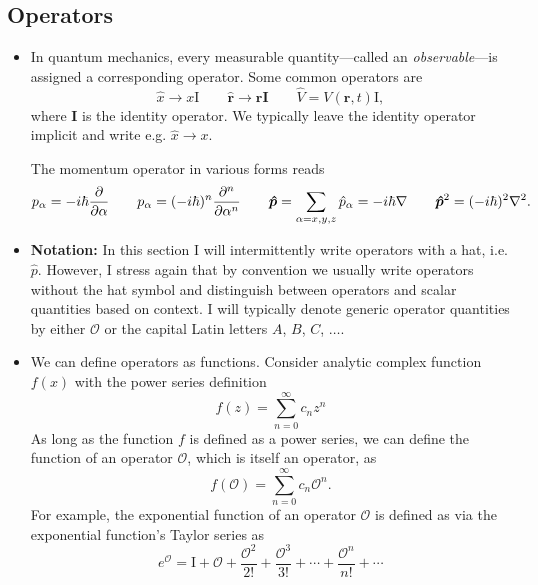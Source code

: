 \documentclass[11pt, a4paper]{article}
\renewcommand{\grad}{\nabla}
\renewcommand{\laplacian}{\nabla^{2}}
\renewcommand{\vec}[1]{\bm{#1}}  %
\newcommand{\mat}[1]{\mathbf{#1}}  %
\renewcommand{\r}{\vec{r}}  %
\renewcommand{\O}{\mathcal{O}}  %
\begin{document}
\subsection{Operators}
\begin{itemize}
	\item In quantum mechanics, every measurable quantity---called an \textit{observable}---is assigned a corresponding operator. Some common operators are
	\begin{equation*}
		\hat{x} \to x \mathrm{I} \qquad \hat{\r} \to \r \mat{I} \qquad \hat{V} = V(\r, t)\mathrm{I},
	\end{equation*}
	where $ \mat{I} $ is the identity operator. We typically leave the identity operator implicit and write e.g. $ \hat{x} \to x $. 
	
	The momentum operator in various forms reads
	\begin{equation*}
		p_{\alpha} = -i\hbar \pdv{}{\alpha} \qquad p_{\alpha} = (-i\hbar)^{n} \pdv[n]{}{\alpha} \qquad \vec{\hat{p}} = \sum_{\alpha = x, y, z} \hat{p}_{\alpha} = - i \hbar \grad \qquad \vec{\hat{p}}^{2} = (-i\hbar)^{2} \laplacian.
	\end{equation*}
	
	\item \textbf{Notation:} In this section I will intermittently write operators with a hat, i.e. $ \hat{p} $. However, I stress again that by convention we usually write operators without the hat symbol and distinguish between operators and scalar quantities based on context. I will typically denote generic operator quantities by either $ \O $ or the capital Latin letters $ A $, $ B $, $ C $, $ \ldots  $.
	
	\item We can define operators as functions. Consider analytic complex function $ f(x) $ with the power series definition
	\begin{equation*}
		f(z) = \sum_{n=0}^{\infty}c_{n}z^{n}
	\end{equation*}
	As long as the function $ f $ is defined as a power series, we can define the function of an operator $ \O $, which is itself an operator, as
	\begin{equation*}
		f(\O) = \sum_{n = 0}^{\infty}c_{n} \O^{n}.	
	\end{equation*}
	For example, the exponential function of an operator $ \O $ is defined as via the exponential function's Taylor series as
	\begin{equation*}
		e^{\O} = \mathrm{I} + \O + \frac{\O^{2}}{2!} + \frac{\O^{3}}{3!} + \cdots + \frac{\O^{n}}{n!} + \cdots 
	\end{equation*}
	

\end{itemize}
\end{document}
